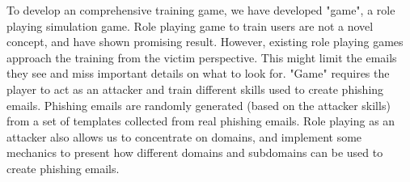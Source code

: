 To develop an comprehensive training game, we have developed "game", a role playing simulation game. Role playing game to train users are not a novel concept\cite{what_hack}, and have shown promising result. However, existing role playing games approach the training from the victim perspective. This might limit the emails they see and miss important details on what to look for. "Game" requires the player to act as an attacker and train different skills used to create phishing emails. Phishing emails are randomly generated (based on the attacker skills) from a set of templates collected from real phishing emails. Role playing as an attacker also allows us to concentrate on domains, and implement some mechanics to present how different domains and subdomains can be used to create phishing emails.

